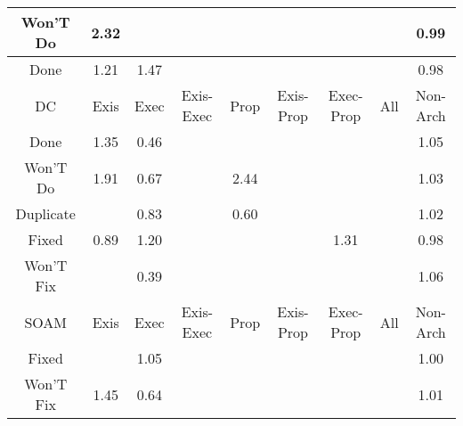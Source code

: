 \begin{tabular}{|c||c|c|c|c|c|c|c|c|}
\hline
Won'T Do & \cellcolor[rgb]{0.7447729567142862,0.7617345584436093,0.42} 2.32 &  &  &  &  &  &  & \cellcolor[rgb]{0.9072088409610896,0.8267885138824903,0.4173949182303502} 0.99 \\ 
\hline
Done & \cellcolor[rgb]{0.8836404124028414,0.8275138795592406,0.42} 1.21 & \cellcolor[rgb]{0.8511063234354227,0.812102995311516,0.42} 1.47 &  &  &  &  &  & \cellcolor[rgb]{0.9069297771297579,0.8254676117475206,0.41713445865444065} 0.98 \\ 
\hline
\hline
DC & Exis & Exec & Exis-Exec & Prop & Exis-Prop & Exec-Prop & All & Non-Arch \\ 
\hline
Done & \cellcolor[rgb]{0.8660199011924434,0.8191673216174732,0.42} 1.35 & \cellcolor[rgb]{0.8093088878378223,0.3633954024323587,0.32602162864863415} 0.46 &  &  &  &  &  & \cellcolor[rgb]{0.9034479385367291,0.8368963919384506,0.42} 1.05 \\ 
\hline
Won'T Do & \cellcolor[rgb]{0.7959141195606936,0.7859593197919075,0.42} 1.91 & \cellcolor[rgb]{0.8487928218435605,0.5502860233928527,0.3628733003873231} 0.67 &  & \cellcolor[rgb]{0.7296746481307252,0.7545827280619225,0.42} 2.44 &  &  &  & \cellcolor[rgb]{0.9067936013659735,0.8384811795944085,0.42} 1.03 \\ 
\hline
Duplicate &  & \cellcolor[rgb]{0.8785156185841555,0.6909739279650023,0.3906145773452117} 0.83 &  & \cellcolor[rgb]{0.8346449017516276,0.4833192016243708,0.3496685749681858} 0.60 &  &  &  & \cellcolor[rgb]{0.9077245736932383,0.8389221664862707,0.42} 1.02 \\ 
\hline
Fixed & \cellcolor[rgb]{0.8895309868676323,0.7431133378401261,0.40089558774312345} 0.89 & \cellcolor[rgb]{0.8854101976460546,0.8283521988849731,0.41999999999999993} 1.20 &  &  &  & \cellcolor[rgb]{0.870902803691662,0.8214802754328925,0.42} 1.31 &  & \cellcolor[rgb]{0.9064383362886995,0.8231414584331778,0.41667578053611953} 0.98 \\ 
\hline
Won'T Fix &  & \cellcolor[rgb]{0.7965368446477084,0.3029410646658194,0.3141010550045278} 0.39 &  &  &  &  &  & \cellcolor[rgb]{0.9023978414804941,0.8363989775433919,0.42} 1.06 \\ 
\hline
\hline
SOAM & Exis & Exec & Exis-Exec & Prop & Exis-Prop & Exec-Prop & All & Non-Arch \\ 
\hline
Fixed &  & \cellcolor[rgb]{0.9043268083507247,0.8373126986924485,0.42} 1.05 &  &  &  &  &  & \cellcolor[rgb]{0.9094973492674374,0.8376207865325374,0.419530859316275} 1.00 \\ 
\hline
Won'T Fix & \cellcolor[rgb]{0.8541118638725427,0.8135266723606781,0.42} 1.45 & \cellcolor[rgb]{0.8432075604377153,0.5238491194051852,0.35766038974186753} 0.64 &  &  &  &  &  & \cellcolor[rgb]{0.9083751447492441,0.8392303317233262,0.42} 1.01 \\ 

\end{tabular}
